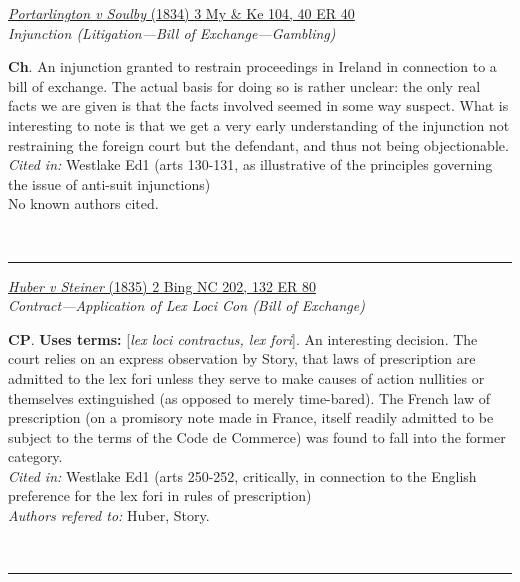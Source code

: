\documentclass[twoside]{article}
\begin{document}
        \begin{small}
        \begin{center}
        \href{https://heinonline.org/HOL/P?h=hein.engrep/engrc0040&i=48}{\textit{Portarlington v Soulby} (1834) 3 My \& Ke 104, 40 ER 40} \label{99} \\ 
\textit{Injunction (Litigation---Bill of Exchange---Gambling)}\\
        \end{center}
        \textbf{Ch}. An injunction granted to restrain proceedings in Ireland in connection to a bill of exchange. The actual basis for doing so is rather unclear: the only real facts we are given is that the facts involved seemed in some way suspect. What is interesting to note is that we get a very early understanding of the injunction not restraining the foreign court but the defendant, and thus not being objectionable.\\\textit{Cited in: }Westlake Ed1 (arts 130-131, as illustrative of the principles governing the issue of anti-suit injunctions)\\No known authors cited.
        \end{small}\\
        \rule{\textwidth}{0.5pt}
        

        \begin{small}
        \begin{center}
        \href{https://heinonline.org/HOL/P?h=hein.engrep/engrg0132&i=84}{\textit{Huber v Steiner} (1835) 2 Bing NC 202, 132 ER 80} \label{79} \\ 
\textit{Contract---Application of Lex Loci Con (Bill of Exchange)}\\
        \end{center}
        \textbf{CP}.  \textbf{Uses terms: }[\textit{lex loci contractus, lex fori}]. An interesting decision. The court relies on an express observation by Story, that laws of prescription are admitted to the lex fori unless they serve to make causes of action nullities or themselves extinguished (as opposed to merely time-bared). The French law of prescription (on a promisory note made in France, itself readily admitted to be subject to the terms of the Code de Commerce) was found to fall into the former category.\\\textit{Cited in: }Westlake Ed1 (arts 250-252, critically, in connection to the English preference for the lex fori in rules of prescription)\\\textit{Authors refered to: }Huber, Story.
        \end{small}\\
        \rule{\textwidth}{0.5pt}
        
\end{document}
